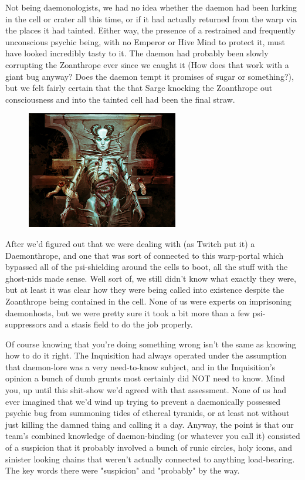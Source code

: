 Not being daemonologists, we had no idea whether the daemon had been lurking in the cell or crater all this time, or if it had actually returned from the warp via the places it had tainted. 
Either way, the presence of a restrained and frequently unconscious psychic being, with no Emperor or Hive Mind to protect it, must have looked incredibly tasty to it. 
The daemon had probably been slowly corrupting the Zoanthrope ever since we caught it (How does that work with a giant bug anyway? 
Does the daemon tempt it promises of sugar or something?), but we felt fairly certain that the that Sarge knocking the Zoanthrope out consciousness and into the tainted cell had been the final straw.

\begin{figure}
	\begin{center}
		\includegraphics[width=\figwidth]{pics/15/41.png}
	\end{center}
\end{figure}
After we'd figured out that we were dealing with (as Twitch put it) a Daemonthrope, and one that was sort of connected to this warp-portal which bypassed all of the psi-shielding around the cells to boot, all the stuff with the ghost-nids made sense. 
Well sort of, we still didn't know what exactly they were, but at least it was clear how they were being called into existence despite the Zoanthrope being contained in the cell. 
None of us were experts on imprisoning daemonhosts, but we were pretty sure it took a bit more than a few psi-suppressors and a stasis field to do the job properly.

Of course knowing that you're doing something wrong isn't the same as knowing how to do it right. 
The Inquisition had always operated under the assumption that daemon-lore was a very need-to-know subject, and in the Inquisition's opinion a bunch of dumb grunts most certainly did NOT need to know. 
Mind you, up until this shit-show we'd agreed with that assessment. 
None of us had ever imagined that we'd wind up trying to prevent a daemonically possessed psychic bug from summoning tides of ethereal tyranids, or at least not without just killing the damned thing and calling it a day. 
Anyway, the point is that our team's combined knowledge of daemon-binding (or whatever you call it) consisted of a suspicion that it probably involved a bunch of runic circles, holy icons, and sinister looking chains that weren't actually connected to anything load-bearing. 
The key words there were "suspicion" and "probably" by the way.

